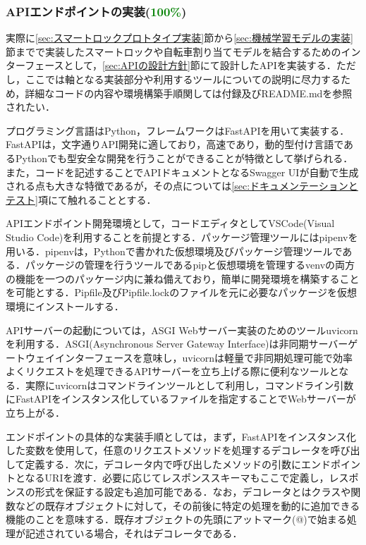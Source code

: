       \subsubsection{APIエンドポイントの実装(\textcolor{green}{100\%})}
        \label{sec:APIエンドポイントの実装}
          \par 実際に\ref{sec:スマートロックプロトタイプ実装}節から\ref{sec:機械学習モデルの実装}節までで実装したスマートロックや自転車割り当てモデルを結合するためのインターフェースとして，\ref{sec:APIの設計方針}節にて設計したAPIを実装する．ただし，ここでは軸となる実装部分や利用するツールについての説明に尽力するため，詳細なコードの内容や環境構築手順関しては付録及びREADME.mdを参照されたい．
          \par プログラミング言語はPython，フレームワークはFastAPIを用いて実装する．FastAPIは，文字通りAPI開発に適しており，高速であり，動的型付け言語であるPythonでも型安全な開発を行うことができることが特徴として挙げられる．また，コードを記述することでAPIドキュメントとなるSwagger UIが自動で生成される点も大きな特徴であるが，その点については\ref{sec:ドキュメンテーションとテスト}項にて触れることとする．
          \par APIエンドポイント開発環境として，コードエディタとしてVSCode(Visual Studio Code)を利用することを前提とする．パッケージ管理ツールにはpipenvを用いる．pipenvは，Pythonで書かれた仮想環境及びパッケージ管理ツールである．パッケージの管理を行うツールであるpipと仮想環境を管理するvenvの両方の機能を一つのパッケージ内に兼ね備えており，簡単に開発環境を構築することを可能とする．Pipfile及びPipfile.lockのファイルを元に必要なパッケージを仮想環境にインストールする．
          \par APIサーバーの起動については，ASGI Webサーバー実装のためのツールuvicornを利用する．ASGI(Asynchronous Server Gateway Interface)は非同期サーバーゲートウェイインターフェースを意味し，uvicornは軽量で非同期処理可能で効率よくリクエストを処理できるAPIサーバーを立ち上げる際に便利なツールとなる．実際にuvicornはコマンドラインツールとして利用し，コマンドライン引数にFastAPIをインスタンス化しているファイルを指定することでWebサーバーが立ち上がる．
          \par エンドポイントの具体的な実装手順としては，まず，FastAPIをインスタンス化した変数を使用して，任意のリクエストメソッドを処理するデコレータを呼び出して定義する．次に，デコレータ内で呼び出したメソッドの引数にエンドポイントとなるURIを渡す．必要に応じてレスポンススキーマもここで定義し，レスポンスの形式を保証する設定も追加可能である．なお，デコレータとはクラスや関数などの既存オブジェクトに対して，その前後に特定の処理を動的に追加できる機能のことを意味する．既存オブジェクトの先頭にアットマーク(@)で始まる処理が記述されている場合，それはデコレータである．
